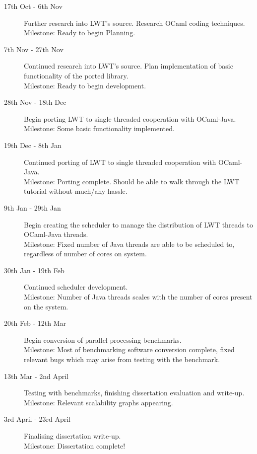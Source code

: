 \documentclass[a4paper]{article}
\begin{document}
\begin{description}
\item[17th Oct - 6th Nov] Further research into LWT's source. Research OCaml coding techniques.\\
Milestone: Ready to begin Planning.

\item[7th Nov - 27th Nov]
Continued research into LWT's source. Plan implementation of basic functionality of the ported library.\\
Milestone: Ready to begin development.

\item[28th Nov - 18th Dec] Begin porting LWT to single threaded cooperation with OCaml-Java.\\
Milestone: Some basic functionality implemented.

\item[19th Dec - 8th Jan] Continued porting of LWT to single threaded cooperation with OCaml-Java.\\
Milestone: Porting complete. Should be able to walk through the LWT tutorial without much/any hassle.

\item[9th Jan - 29th Jan] Begin creating the scheduler to manage the distribution of LWT threads to OCaml-Java threads.\\
Milestone: Fixed number of Java threads are able to be scheduled to, regardless of number of cores on system.

\item[30th Jan - 19th Feb] Continued scheduler development.\\
Milestone: Number of Java threads scales with the number of cores present on the system.

\item[20th Feb - 12th Mar] Begin conversion of parallel processing benchmarks.\\
Milestone: Most of benchmarking software conversion complete, fixed relevant bugs which may arise from testing with the benchmark.

\item[13th Mar - 2nd April] Testing with benchmarks, finishing dissertation evaluation and write-up.\\
Milestone: Relevant scalability graphs appearing.

\item[3rd April - 23rd April] Finalising dissertation write-up.\\
Milestone: Dissertation complete!

\end{description}
\end{document}

